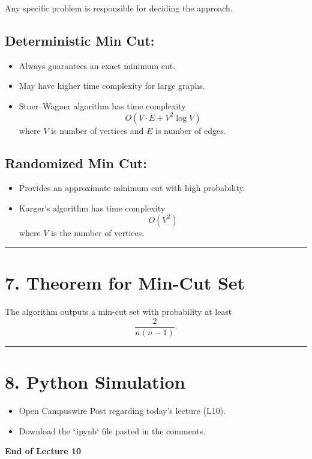 \documentclass[12pt]{article}
\begin{document}
Any specific problem is responsible for deciding the approach.

\subsection*{Deterministic Min Cut:}

\begin{itemize}
    \item Always guarantees an exact minimum cut.
    \item May have higher time complexity for large graphs.
    \item Stoer–Wagner algorithm has time complexity
    \[
    O(V \cdot E + V^2 \log V)
    \]
    where \( V \) is number of vertices and \( E \) is number of edges.
\end{itemize}

\subsection*{Randomized Min Cut:}

\begin{itemize}
    \item Provides an approximate minimum cut with high probability.
    \item Karger’s algorithm has time complexity
    \[
    O(V^2)
    \]
    where \( V \) is the number of vertices.
\end{itemize}

\hrule
\vspace{0.5cm}

\section*{7. Theorem for Min-Cut Set}

The algorithm outputs a min-cut set with probability at least
\[
\frac{2}{n(n-1)}.
\]

\hrule
\vspace{0.5cm}

\section*{8. Python Simulation}

\begin{itemize}
    \item Open Campuswire Post regarding today’s lecture (L10).
    \item Download the `.ipynb` file pasted in the comments.
\end{itemize}

\bigskip
\centerline{\textbf{End of Lecture 10}}
\end{document}
